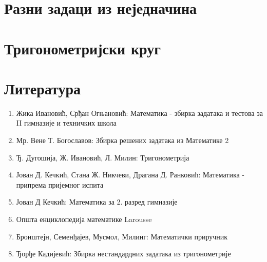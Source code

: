 \documentclass[a4paper,12pt]{article}
\begin{document}
\section{Разни задаци из неједначина}




\section{Тригонометријски круг}



\section{Литература}

\begin{enumerate}
\item Жика Ивановић, Срђан Огњановић: Математика - збирка задатака и тестова за II гимназије и техничких школа
\item Мр. Вене Т. Богославов: Збирка решених задатака из Математике 2
\item Ђ. Дугошија, Ж. Ивановић, Л. Милин: Тригонометрија
\item Јован Д. Кечкић, Стана Ж. Никчеви, Драгана Д. Ранковић: Математика - припрема пријемног испита
\item Јован Д Кечкић: Математика за 2. разред гимназије
\item Општа енциклопедија математике Larousse
\item Бронштејн, Семенђајев, Мусмол, Милинг: Математички приручник
\item Ђорђе Кадијевић: Збирка нестандардних задатака из тригонометрије
\end{enumerate}
\end{document}
